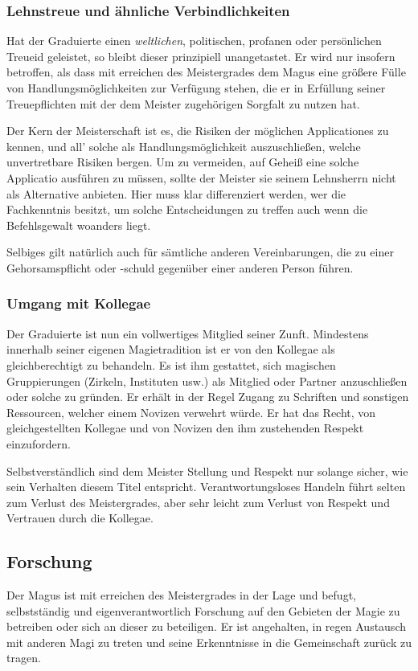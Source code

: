 \documentclass[a5paper,8pt]{book}
\begin{document}
\subsubsection*{Lehnstreue und ähnliche Verbindlichkeiten}
Hat der Graduierte einen \textit{weltlichen}, politischen, profanen oder
persönlichen Treueid geleistet, so bleibt dieser prinzipiell unangetastet. Er
wird nur insofern betroffen, als dass mit erreichen des Meistergrades dem Magus
eine größere Fülle von Handlungsmöglichkeiten zur Verfügung stehen, die er in
Erfüllung seiner Treuepflichten mit der dem Meister zugehörigen Sorgfalt zu
nutzen hat. 

Der Kern der Meisterschaft ist es, die Risiken der möglichen Applicationes zu
kennen, und all' solche als Handlungsmöglichkeit auszuschließen, welche
unvertretbare Risiken bergen. Um zu vermeiden, auf Geheiß eine solche
Applicatio ausführen zu müssen, sollte der Meister sie seinem Lehnsherrn nicht
als Alternative anbieten. Hier muss klar differenziert werden, wer die
Fachkenntnis besitzt, um solche Entscheidungen zu treffen auch wenn die
Befehlsgewalt woanders liegt.

Selbiges gilt natürlich auch für sämtliche anderen Vereinbarungen, die zu einer
Gehorsamspflicht oder -schuld gegenüber einer anderen Person führen.

\subsubsection*{Umgang mit Kollegae}
Der Graduierte ist nun ein vollwertiges Mitglied seiner Zunft. Mindestens
innerhalb seiner eigenen Magietradition ist er von den Kollegae als
gleichberechtigt zu behandeln. Es ist ihm gestattet, sich magischen
Gruppierungen (Zirkeln, Instituten usw.) als Mitglied oder Partner
anzuschließen oder solche zu gründen. Er erhält in der Regel Zugang zu
Schriften und sonstigen Ressourcen, welcher einem Novizen verwehrt würde.
Er hat das Recht, von gleichgestellten Kollegae und von Novizen den ihm
zustehenden Respekt einzufordern.

Selbstverständlich sind dem Meister Stellung und Respekt nur solange sicher,
wie sein Verhalten diesem Titel entspricht. Verantwortungsloses Handeln führt
selten zum Verlust des Meistergrades, aber sehr leicht zum Verlust von Respekt
und Vertrauen durch die Kollegae.

\subsection*{Forschung}
Der Magus ist mit erreichen des Meistergrades in der Lage und befugt,
selbstständig und eigenverantwortlich Forschung auf den Gebieten der Magie zu
betreiben oder sich an dieser zu beteiligen. Er ist angehalten, in regen
Austausch mit anderen Magi zu treten und seine Erkenntnisse in die Gemeinschaft
zurück zu tragen. 
\end{document}
